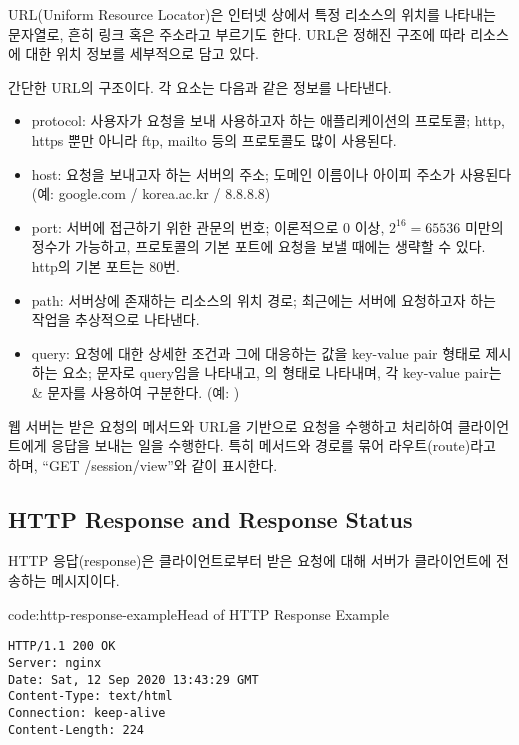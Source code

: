 URL(Uniform Resource Locator)은 인터넷 상에서 특정 리소스의 위치를 나타내는 문자열로, 흔히 링크 혹은 주소라고 부르기도 한다. URL은 정해진 구조에 따라 리소스에 대한 위치 정보를 세부적으로 담고 있다.

    {}

\는 간단한 URL의 구조이다. 각 요소는 다음과 같은 정보를 나타낸다.

\begin{itemize}
    \item protocol: 사용자가 요청을 보내 사용하고자 하는 애플리케이션의 프로토콜; http, https 뿐만 아니라 ftp, mailto 등의 프로토콜도 많이 사용된다.
    \item host: 요청을 보내고자 하는 서버의 주소; 도메인 이름이나 아이피 주소가 사용된다 (예: google.com / korea.ac.kr / 8.8.8.8)
    \item port: 서버에 접근하기 위한 관문의 번호; 이론적으로 0 이상, $2^{16}=65536$ 미만의 정수가 가능하고, 프로토콜의 기본 포트에 요청을 보낼 때에는 생략할 수 있다. http의 기본 포트는 80번.
    \item path: 서버상에 존재하는 리소스의 위치 경로; 최근에는 서버에 요청하고자 하는 작업을 추상적으로 나타낸다.
    \item query: 요청에 대한 상세한 조건과 그에 대응하는 값을 key-value pair 형태로 제시하는 요소;  문자로 query임을 나타내고, 의 형태로 나타내며, 각 key-value pair는 \cd\& 문자를 사용하여 구분한다. (예: )
\end{itemize}

웹 서버는 받은 요청의 메서드와 URL을 기반으로 요청을 수행하고 처리하여 클라이언트에게 응답을 보내는 일을 수행한다. 특히 메서드와 경로를 묶어 라우트(route)라고 하며, ``GET /session/view''와 같이 표시한다.

\subsection*{HTTP Response and Response Status}
HTTP 응답(response)은 클라이언트로부터 받은 요청에 대해 서버가 클라이언트에 전송하는 메시지이다.

\begin{codeenv}{code:http-response-example}{Head of HTTP Response Example}\begin{verbatim}
HTTP/1.1 200 OK
Server: nginx
Date: Sat, 12 Sep 2020 13:43:29 GMT
Content-Type: text/html
Connection: keep-alive
Content-Length: 224
\end{verbatim}
\end{codeenv}

